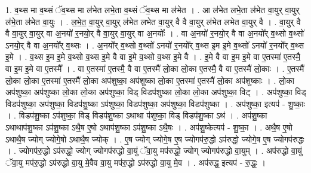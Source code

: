 \documentclass[17pt]{extarticle}
\begin{document}
1. व॒थ्स मा व॒थ्सं ॅव॒थ्स मा ल॑भेत लभे॒ता व॒थ्सं ॅव॒थ्स मा ल॑भेत । . आ ल॑भेत लभे॒ता ल॑भेत वा॒युर् वा॒युर् ल॑भे॒ता ल॑भेत वा॒युः । . ल॒भे॒त॒ वा॒युर् वा॒युर् ल॑भेत लभेत वा॒युर् वै वै वा॒युर् ल॑भेत लभेत वा॒युर् वै । . वा॒युर् वै वै वा॒युर् वा॒युर् वा अ॒नयो॑ र॒नयो॒र् वै वा॒युर् वा॒युर् वा अ॒नयोः᳚ । . वा अ॒नयो॑ र॒नयो॒र् वै वा अ॒नयो᳚र् व॒थ्सो व॒थ्सो॑ ऽनयो॒र् वै वा अ॒नयो᳚र् व॒थ्सः । . अ॒नयो᳚र् व॒थ्सो व॒थ्सो॑ ऽनयो॑ र॒नयो᳚र् व॒थ्स इ॒म इ॒मे व॒थ्सो॑ ऽनयो॑ र॒नयो᳚र् व॒थ्स इ॒मे । . व॒थ्स इ॒म इ॒मे व॒थ्सो व॒थ्स इ॒मे वै वा इ॒मे व॒थ्सो व॒थ्स इ॒मे वै । . इ॒मे वै वा इ॒म इ॒मे वा ए॒तस्मा॑ ए॒तस्मै॒ वा इ॒म इ॒मे वा ए॒तस्मै᳚ । . वा ए॒तस्मा॑ ए॒तस्मै॒ वै वा ए॒तस्मै॑ लो॒का लो॒का ए॒तस्मै॒ वै वा ए॒तस्मै॑ लो॒काः । . ए॒तस्मै॑ लो॒का लो॒का ए॒तस्मा॑ ए॒तस्मै॑ लो॒का अप॑शुष्का॒ अप॑शुष्का लो॒का ए॒तस्मा॑ ए॒तस्मै॑ लो॒का अप॑शुष्काः । . लो॒का अप॑शुष्का॒ अप॑शुष्का लो॒का लो॒का अप॑शुष्का॒ विड् विडप॑शुष्का लो॒का लो॒का अप॑शुष्का॒ विट् । . अप॑शुष्का॒ विड् विडप॑शुष्का॒ अप॑शुष्का॒ विडप॑शु॒ष्का ऽप॑शुष्का॒ विडप॑शुष्का॒ अप॑शुष्का॒ विडप॑शुष्का । . अप॑शुष्का॒ इत्यप॑ - शु॒ष्काः॒ । . विडप॑शु॒ष्का ऽप॑शुष्का॒ विड् विडप॑शु॒ष्का ऽथाथा प॑शुष्का॒ विड् विडप॑शु॒ष्का ऽथ॑ । . अप॑शु॒ष्का ऽथाथाप॑शु॒ष्का ऽप॑शु॒ष्का ऽथै॒ष ए॒षो ऽथाप॑शु॒ष्का ऽप॑शु॒ष्का ऽथै॒षः । . अप॑शु॒ष्केत्यप॑ - शु॒ष्का॒ । . अथै॒ष ए॒षो ऽथाथै॒ष ज्योग् ज्योगे॒षो ऽथाथै॒ष ज्योक् । . ए॒ष ज्योग् ज्योगे॒ष ए॒ष ज्योगप॑रु॒द्धो ऽप॑रुद्धो॒ ज्योगे॒ष ए॒ष ज्योगप॑रुद्धः । . ज्योगप॑रु॒द्धो ऽप॑रुद्धो॒ ज्योग् ज्योगप॑रुद्धो वा॒युं ॅवा॒यु मप॑रुद्धो॒ ज्योग् ज्योगप॑रुद्धो वा॒युम् । . अप॑रुद्धो वा॒युं ॅवा॒यु मप॑रु॒द्धो ऽप॑रुद्धो वा॒यु मे॒वैव वा॒यु मप॑रु॒द्धो ऽप॑रुद्धो वा॒यु मे॒व । . अप॑रुद्ध॒ इत्यप॑ - रु॒द्धः॒ । \newline
\end{document}
